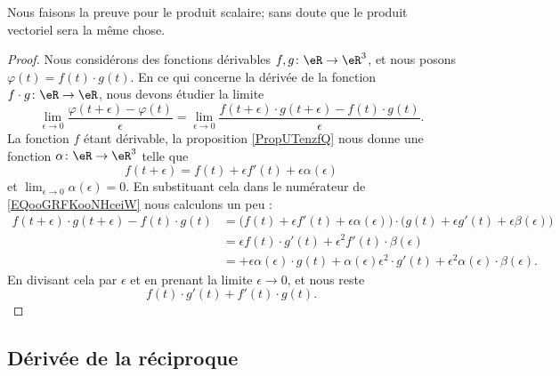 Nous faisons la preuve pour le produit scalaire; sans doute que le produit vectoriel sera la même chose.
\begin{proof}
    Nous considérons des fonctions dérivables \( f,g\colon \eR\to \eR^3\), et nous posons \( \varphi(t)=f(t)\cdot g(t)\). En ce qui concerne la dérivée de la fonction \( f\cdot g\colon \eR\to \eR\), nous devons étudier la limite
    \begin{equation}        \label{EQooGRFKooNHceiW}
        \lim_{\epsilon\to 0}\frac{ \varphi(t+\epsilon)-\varphi(t) }{ \epsilon }=\lim_{\epsilon\to 0}\frac{ f(t+\epsilon)\cdot g(t+\epsilon)-f(t)\cdot g(t) }{ \epsilon }.
    \end{equation}
    La fonction \( f\) étant dérivable, la proposition \ref{PropUTenzfQ} nous donne une fonction \( \alpha\colon \eR\to \eR^3\) telle que
    \begin{equation}
        f(t+\epsilon)=f(t)+\epsilon f'(t)+\epsilon\alpha(\epsilon)
    \end{equation}
    et \( \lim_{\epsilon\to 0}\alpha(\epsilon)=0\). En substituant cela dans le numérateur de \eqref{EQooGRFKooNHceiW} nous calculons un peu :
    \begin{subequations}
        \begin{align}
            f(t+\epsilon)\cdot g(t+\epsilon)-f(t)\cdot g(t)&=\big( f(t)+\epsilon f'(t)+\epsilon \alpha(\epsilon) \big)\cdot\big( g(t)+\epsilon g'(t)+\epsilon\beta(\epsilon) \big)\\
            &=\epsilon f(t)\cdot g'(t)+\epsilon^2 f'(t)\cdot \beta(\epsilon)\\
            &=+\epsilon\alpha(\epsilon)\cdot g(t)+\alpha(\epsilon)\epsilon^2\cdot g'(t)+\epsilon^2\alpha(\epsilon)\cdot \beta(\epsilon).
        \end{align}
    \end{subequations}
    En divisant cela par \( \epsilon\) et en prenant la limite \( \epsilon\to 0\), et nous reste
    \begin{equation}
        f(t)\cdot g'(t)+f'(t)\cdot g(t).
    \end{equation}
\end{proof}

\subsection{Dérivée de la réciproque}

